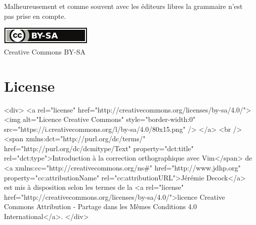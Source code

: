 \documentclass{article}
\begin{document}
Malheureusement et comme souvent avec les éditeurs libres la grammaire n'est
pas prise en compte.



\nocite{*}                    %




\ifpdf
    \vfill %
    \begin{center}
        \href{http://creativecommons.org/licenses/by-sa/4.0/}{\includegraphics[width=.15\linewidth]{fig/cc_by_sa_small}}\\
        \small{Creative Commons BY-SA}
    \end{center}
\else
    \section*{License}\label{sec:license}

    \begin{rawhtml}

        <div>
            <a rel="license" href="http://creativecommons.org/licenses/by-sa/4.0/">
                <img alt="Licence Creative Commons" style="border-width:0" src="https://i.creativecommons.org/l/by-sa/4.0/80x15.png" />
            </a>
            <br />
            <span xmlns:dct="http://purl.org/dc/terms/" href="http://purl.org/dc/dcmitype/Text" property="dct:title" rel="dct:type">Introduction à la correction orthographique avec Vim</span> de <a xmlns:cc="http://creativecommons.org/ns#" href="http://www.jdhp.org" property="cc:attributionName" rel="cc:attributionURL">Jérémie Decock</a> est mis à disposition selon les termes de la <a rel="license" href="http://creativecommons.org/licenses/by-sa/4.0/">licence Creative Commons Attribution -  Partage dans les Mêmes Conditions 4.0 International</a>.
        </div>

    \end{rawhtml}
\fi
\end{document}
